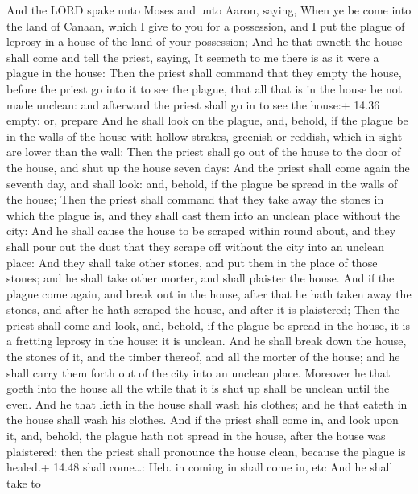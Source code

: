  And the LORD spake unto Moses and unto Aaron, saying,
 When ye be come into the land of Canaan, which I give to
you for a possession, and I put the plague of leprosy in a house of the
land of your possession;  And he that owneth the house
shall come and tell the priest, saying, It seemeth to me there is as it
were a plague in the house:  Then the priest shall command
that they empty the house, before the priest go into it to see the
plague, that all that is in the house be not made unclean: and afterward
the priest shall go in to see the house:+ 14.36 empty: or, prepare
 And he shall look on the plague, and, behold, if the
plague be in the walls of the house with hollow strakes, greenish or
reddish, which in sight are lower than the wall;  Then the
priest shall go out of the house to the door of the house, and shut up
the house seven days:  And the priest shall come again the
seventh day, and shall look: and, behold, if the plague be spread in the
walls of the house;  Then the priest shall command that
they take away the stones in which the plague is, and they shall cast
them into an unclean place without the city:  And he shall
cause the house to be scraped within round about, and they shall pour
out the dust that they scrape off without the city into an unclean
place:  And they shall take other stones, and put them in
the place of those stones; and he shall take other morter, and shall
plaister the house.  And if the plague come again, and
break out in the house, after that he hath taken away the stones, and
after he hath scraped the house, and after it is plaistered;
 Then the priest shall come and look, and, behold, if the
plague be spread in the house, it is a fretting leprosy in the house: it
is unclean.  And he shall break down the house, the stones
of it, and the timber thereof, and all the morter of the house; and he
shall carry them forth out of the city into an unclean place.
 Moreover he that goeth into the house all the while that
it is shut up shall be unclean until the even.  And he that
lieth in the house shall wash his clothes; and he that eateth in the
house shall wash his clothes.  And if the priest shall come
in, and look upon it, and, behold, the plague hath not spread in the
house, after the house was plaistered: then the priest shall pronounce
the house clean, because the plague is healed.+ 14.48 shall come\ldots:
Heb. in coming in shall come in, etc  And he shall take to
